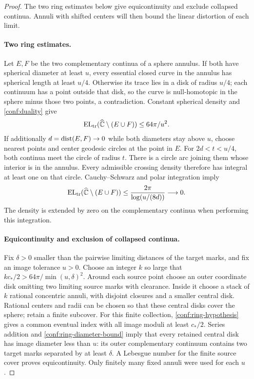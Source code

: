 \begin{proof}
The two ring estimates below give equicontinuity and exclude collapsed
continua.  Annuli with shifted centers will then bound the linear
distortion of each limit.

\paragraph{Two ring estimates.}
Let \(E,F\) be the two
complementary continua of a sphere annulus.  If both have spherical
diameter at least \(u\), every essential closed curve in the annulus
has spherical length at least \(u/4\).  Otherwise its trace lies
in a disk of radius \(u/4\); each continuum has a point outside
that disk, so the curve is null-homotopic in the sphere minus those
two points, a contradiction.  Constant spherical density and
\eqref{conf:duality} give
\begin{equation}
 \EL_{\rm tr}(\Chat\setminus(E\cup F))
       \le 64\pi/u^2.
 \label{conf:ring-diameter-bound}
\end{equation}
If additionally \(d=\operatorname{dist}(E,F)\to0\) while both diameters stay
above \(u\), choose nearest points and center geodesic circles at
the point in \(E\).  For \(2d<t<u/4\), both continua meet the
circle of radius \(t\).  There is a circle arc joining them whose
interior is in the annulus.  Every admissible crossing density
therefore has integral at least one on that circle.  Cauchy--Schwarz
and polar integration imply
\begin{equation}
 \EL_{\rm tr}(\Chat\setminus(E\cup F))
       \le \frac{2\pi}{\log(u/(8d))}\longrightarrow0.
 \label{conf:ring-touching-bound}
\end{equation}
The density is extended by zero on the complementary continua when
performing this integration.

\paragraph{Equicontinuity and exclusion of collapsed continua.}
Fix \(\delta>0\) smaller than the pairwise limiting distances of
the target marks, and fix an image tolerance \(u>0\).  Choose
an integer \(k\) so large that
\(kc_*/2>64\pi/\min(u,\delta)^2\).  Around each source point
choose an outer coordinate disk omitting two limiting source marks
with clearance.  Inside it choose a stack of \(k\) rational
concentric annuli, with disjoint closures and a smaller central
disk.  Rational centers and radii can be chosen so that these
central disks cover the sphere; retain a finite subcover.  For this
finite collection, \eqref{conf:ring-hypothesis} gives a common
eventual index with all image moduli at least \(c_*/2\).  Series
addition and \eqref{conf:ring-diameter-bound} imply that every
retained central disk has image diameter less than \(u\): its
outer complementary continuum contains two target marks separated
by at least \(\delta\).  A Lebesgue number for the finite source
cover proves equicontinuity.  Only finitely many fixed annuli were
used for each \(u\).


\end{proof}
